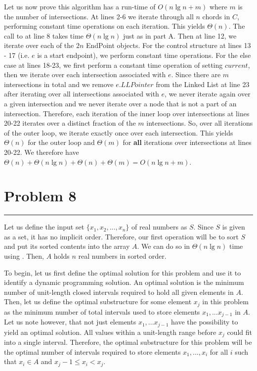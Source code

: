 \documentclass[11pt]{article}
\def\separateline{\medskip\hrule\medskip}
\begin{document}
Let us now prove this algorithm has a run-time of $O(n\lg{n} + m)$ where $m$ is the number of intersections. At lines 2-6 we iterate through all $n$ chords in $C$, performing constant time operations on each iteration. This yields $\Theta(n)$. The call to  at line 8 takes time $\Theta(n\lg{n})$ just as in part A. Then at line 12, we iterate over each of the $2n$ EndPoint objects. For the control structure at lines 13 - 17 (i.e. $e$ is a start endpoint), we perform constant time operations. For the else case at lines 18-23, we first perform a constant time operation of setting $current$, then we iterate over each intersection associated with $e$. Since there are $m$ intersections in total and we remove $e.LLPointer$ from the Linked List at line 23 after iterating over all intersections associated with $e$, we never iterate again over a given intersection and we never iterate over a node that is not a part of an intersection. Therefore, each iteration of the inner loop over intersections at lines 20-22 iterates over a distinct fraction of the $m$ intersections. So, over all iterations of the outer loop, we iterate exactly once over each intersection. This yields $\Theta(n)$ for the outer loop and $\Theta(m)$ for \textbf{all} iterations over intersections at lines 20-22. We therefore have $\Theta(n) + \Theta(n\lg{n}) + \Theta(n) + \Theta(m) = O(n\lg{n} + m)$.

\newpage

\section{Problem 8}
\separateline

Let us define the input set $\{ x_1, x_2, ..., x_n \}$ of real numbers as $S$. Since $S$ is given as a set, it has no implicit order. Therefore, our first operation will be to sort $S$ and put its sorted contents into the array $A$. We can do so in $\Theta(n\lg{n})$ time using . Then, $A$ holds $n$ real numbers in sorted order.

To begin, let us first define the optimal solution for this problem and use it to identify a dynamic programming solution. An optimal solution is the minimum number of unit-length closed intervals required to hold all given elements in $A$. Then, let us define the optimal substructure for some element $x_j$ in this problem as the minimum number of total intervals used to store elements $x_1,...x_{j-1}$ in $A$. Let us note however, that not just elements $x_1,...x_{j-1}$ have the possibility to yield an optimal solution. All values within a unit-length range before $x_j$ could fit into a single interval. Therefore, the optimal substructure for this problem will be the optimal number of intervals required to store elements $x_1,...,x_i$ for all $i$ such that $x_i \in A$ and $x_j - 1 \leq x_i < x_j$.
\end{document}
